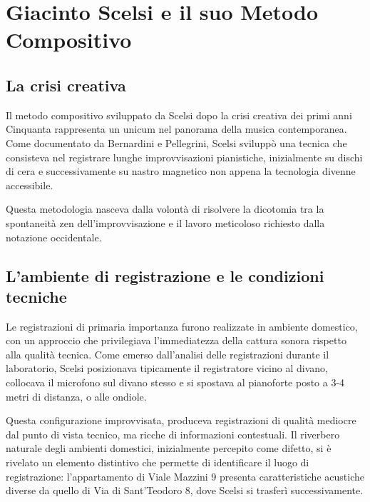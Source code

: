 
\section{Giacinto Scelsi e il suo Metodo Compositivo}
\subsection{La crisi creativa}
Il metodo compositivo sviluppato da Scelsi dopo la crisi creativa dei primi anni Cinquanta rappresenta un unicum nel panorama della musica contemporanea. Come documentato da Bernardini e Pellegrini, Scelsi sviluppò una tecnica che consisteva nel registrare lunghe improvvisazioni pianistiche, inizialmente su dischi di cera e successivamente su nastro magnetico non appena la tecnologia divenne accessibile\cite[p. 176]{pro:beracpmm4ch2011}.

Questa metodologia nasceva dalla volontà di risolvere la dicotomia tra la spontaneità zen dell'improvvisazione e il lavoro meticoloso richiesto dalla notazione occidentale.
\subsection{L'ambiente di registrazione e le condizioni tecniche}
Le registrazioni di primaria importanza furono realizzate in ambiente domestico, con un approccio che privilegiava l'immediatezza della cattura sonora rispetto alla qualità tecnica. Come emerso dall'analisi delle registrazioni durante il laboratorio, Scelsi posizionava tipicamente il registratore vicino al divano, collocava il microfono sul divano stesso e si spostava al pianoforte posto a 3-4 metri di distanza, o alle ondiole.

Questa configurazione improvvisata, produceva registrazioni di qualità mediocre dal punto di vista tecnico, ma ricche di informazioni contestuali. Il riverbero naturale degli ambienti domestici, inizialmente percepito come difetto, si è rivelato un elemento distintivo che permette di identificare il luogo di registrazione: l'appartamento di Viale Mazzini 9 presenta caratteristiche acustiche diverse da quello di Via di Sant'Teodoro 8, dove Scelsi si trasferì successivamente.
